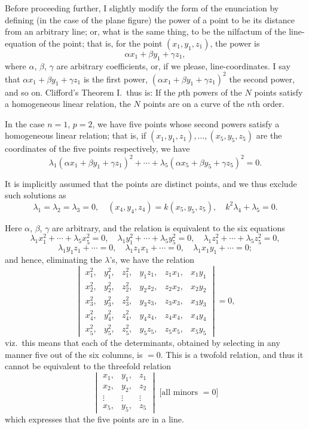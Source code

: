 \documentclass[11pt,a4paper]{article}
\begin{document}
Before proceeding further, I slightly modify the form of the enunciation by defining (in the case of the plane figure) the power of a point to be its distance from an arbitrary line; or, what is the same thing, to be the nilfactum of the line-equation of the point; that is, for the point $(x_1, y_1, z_1)$, the power is
\[
\alpha x_1 + \beta y_1 + \gamma z_1,
\]
where $\alpha$, $\beta$, $\gamma$ are arbitrary coefficients, or, if we please, line-coordinates. I say that $\alpha x_1 + \beta y_1 + \gamma z_1$ is the first power, $(\alpha x_1 + \beta y_1 + \gamma z_1)^2$ the second power, and so on. Clifford's Theorem I.\ thus is: If the $p$th powers of the $N$ points satisfy a homogeneous linear relation, the $N$ points are on a curve of the $n$th order.

In the case $n = 1$, $p = 2$, we have five points whose second powers satisfy a homogeneous linear relation; that is, if $(x_1, y_1, z_1), \ldots, (x_5, y_5, z_5)$ are the coordinates of the five points respectively, we have
\[
\lambda_1 (\alpha x_1 + \beta y_1 + \gamma z_1)^2 + \cdots + \lambda_5 (\alpha x_5 + \beta y_5 + \gamma z_5)^2 = 0.
\]

It is implicitly assumed that the points are distinct points, and we thus exclude such solutions as
\[
\lambda_1 = \lambda_2 = \lambda_3 = 0,\quad (x_4, y_4, z_4) = k (x_5, y_5, z_5),\quad k^2 \lambda_4 + \lambda_5 = 0.
\]

Here $\alpha$, $\beta$, $\gamma$ are arbitrary, and the relation is equivalent to the six equations
\[
\lambda_1 x_1^2 + \cdots + \lambda_5 x_5^2 = 0,\quad \lambda_1 y_1^2 + \cdots + \lambda_5 y_5^2 = 0,\quad \lambda_1 z_1^2 + \cdots + \lambda_5 z_5^2 = 0,
\]
\[
\lambda_1 y_1 z_1 + \cdots = 0,\quad \lambda_1 z_1 x_1 + \cdots = 0,\quad \lambda_1 x_1 y_1 + \cdots = 0;
\]
and hence, eliminating the $\lambda$'s, we have the relation
\[
\begin{vmatrix}
x_1^2, & y_1^2, & z_1^2, & y_1 z_1, & z_1 x_1, & x_1 y_1 \\
x_2^2, & y_2^2, & z_2^2, & y_2 z_2, & z_2 x_2, & x_2 y_2 \\
x_3^2, & y_3^2, & z_3^2, & y_3 z_3, & z_3 x_3, & x_3 y_3 \\
x_4^2, & y_4^2, & z_4^2, & y_4 z_4, & z_4 x_4, & x_4 y_4 \\
x_5^2, & y_5^2, & z_5^2, & y_5 z_5, & z_5 x_5, & x_5 y_5
\end{vmatrix} = 0,
\]
viz.\ this means that each of the determinants, obtained by selecting in any manner five out of the six columns, is $=0$. This is a twofold relation, and thus it cannot be equivalent to the threefold relation
\[
\begin{vmatrix}
x_1, & y_1, & z_1 \\
x_2, & y_2, & z_2 \\
\vdots & \vdots & \vdots \\
x_5, & y_5, & z_5
\end{vmatrix}\; \text{[all minors }=0\text{]}
\]
which expresses that the five points are in a line.
\end{document}
